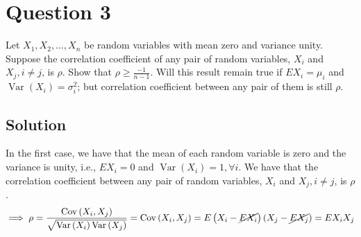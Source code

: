 \section*{Question 3}

Let \( X_{1}, X_{2}, \dots, X_{n} \) be random variables with mean zero and variance unity.
Suppose the correlation coefficient of any pair of random variables, \( X_{i} \) and \( X_{j}, i \neq j \), is \( \rho \).
Show that \( \rho \geq \frac{-1}{n-1} \).
Will this result remain true if \( E X_{i}=\mu_{i} \) and \( \operatorname{Var}\left(X_{i}\right)=\sigma_{i}^{2} \); but correlation coefficient between any pair of them is still \( \rho \).

\subsection*{Solution}

In the first case, we have that the mean of each random variable is zero and the variance is unity, i.e., \( E X_{i}=0 \) and \( \operatorname{Var}\left(X_{i}\right)=1, \forall i \).
We have that the correlation coefficient between any pair of random variables, \( X_{i} \) and \( X_{j}, i \neq j \), is \( \rho \).
\begin{equation*}
    \implies
    \rho
    =
    \frac{\operatorname{Cov}\left(X_{i}, X_{j}\right)}{\sqrt{\operatorname{Var}\left(X_{i}\right) \operatorname{Var}\left(X_{j}\right)}}
    =
    \operatorname{Cov}\left(X_{i}, X_{j}\right)
    =
    E\left(X_{i} - \cancel{E X_{i}}\right)\left(X_{j} - \cancel{E X_{j}}\right)
    =
    E X_{i} X_{j}
\end{equation*}

